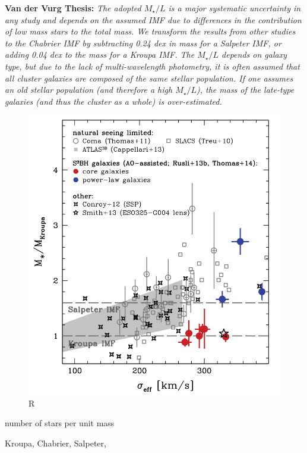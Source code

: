 \textbf{Van der Vurg Thesis:} \textit{The adopted $M_{\star}/L$ is a major systematic uncertainty in any study and depends on the assumed IMF due to differences in the contribution of low mass stars to the total mass. We transform the results from other studies to the Chabrier IMF by subtracting 0.24 dex in mass for a Salpeter IMF, or adding 0.04 dex to the mass for a Kroupa IMF. The $M_{\star}/L$ depends on galaxy type, but due to the lack of multi-wavelength photometry, it is often assumed that all cluster galaxies are composed of the same stellar population. If one assumes an old stellar population (and therefore a high $M_{\star}/L$), the mass of the late-type galaxies (and thus the cluster as a whole) is over-estimated.} \citeyear{Reference2}

\begin{figure}[H]
\centering
\includegraphics[width=12cm]{images/IMFs.png}
\caption[R]{R}
\end{figure}

number of stars per unit mass

Kroupa, Chabrier, Salpeter, 

